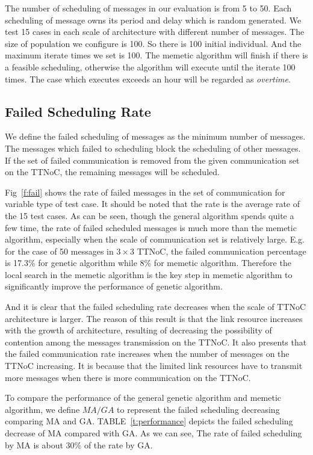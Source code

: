 \documentclass[journal]{IEEEtran}
\theoremstyle{remark}
\begin{document}
The number of scheduling of messages in our evaluation is from 5 to 50.
Each scheduling of message owns its period and delay which is random generated.
We test 15 cases in each scale of architecture with different number of messages.
The size of population we configure is 100.
So there is 100 initial individual.
And the maximum iterate times we set is 100.
The memetic algorithm will finish if there is a feasible scheduling,
 otherwise the algorithm will execute until the iterate 100 times.
The case which executes exceeds an hour will be regarded as \emph{overtime}.

\subsection{Failed Scheduling Rate}
We define the failed scheduling of messages as the minimum number of messages.
The messages which failed to scheduling block the scheduling of other messages.
If the set of failed communication is removed from the given communication set on the TTNoC,
 the remaining messages will be scheduled.

Fig~\ref{f:fail} shows the rate of failed messages in the set of communication for variable type of test case. 
It should be noted that the rate is the average rate of the 15 test cases.
As can be seen,
 though the general algorithm spends quite a few time,
  the rate of failed scheduled messages is much more than the memetic algorithm, especially when the scale of communication set is relatively large.
E.g. for the case of 50 messages in $3\times 3$ TTNoC,
 the failed communication percentage is 17.3\% for genetic algorithm while 8\% for memetic algorithm.
  Therefore the local search in the memetic algorithm is the key step in memetic algorithm to significantly improve the performance of genetic algorithm.

And it is clear that the failed scheduling rate decreases when the scale of TTNoC architecture is larger. 
The reason of this result is that the link resource increases with the growth of architecture,
 resulting of decreasing the possibility of contention among the messages transmission on the TTNoC.
It also presents that the failed communication rate increases when the number of messages on the TTNoC increasing.
It is because that the limited link resources have to transmit more messages when there is more communication on the TTNoC.

To compare the performance of the general genetic algorithm and memetic algorithm,
 we define $MA/GA$ to represent the failed scheduling decreasing comparing MA and GA.
TABLE~\ref{t:performance} depicts the failed scheduling decrease of MA compared with GA.
As we can see, The rate of failed scheduling by MA is about 30\% of the rate by GA.
\end{document}

